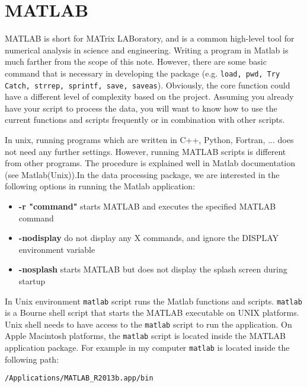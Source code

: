 \section{MATLAB\textsuperscript{\textregistered}}

MATLAB\textsuperscript{\textregistered} is short for MATrix LABoratory, and is a common high-level tool for numerical analysis in science and engineering. Writing a program in Matlab is much farther from the scope of this note. However, there are some basic command that is necessary in developing the package (e.g. \texttt{load, pwd, Try Catch, strrep, sprintf, save, saveas}). Obviously, the core function could have a different level of complexity based on the project. Assuming you already have your script to process the data, you will want to know how to use the current functions and scripts frequently or in combination with other scripts.  

\noindent
In unix, running programs which are written in C++, Python, Fortran, ... does not need any further settings. However, running MATLAB scripts is different from other programs. The procedure is explained well in Matlab documentation (see Matlab(Unix)).In the data processing package,  we are interested in the following options in running the Matlab application:

\begin{itemize}
  \item   \textbf{-r "command"} starts MATLAB and executes the specified MATLAB command
    \item \textbf{-nodisplay} do not display any X commands, and ignore the DISPLAY environment variable
  \item   \textbf{-nosplash} starts MATLAB but does not display the splash screen during startup
\end{itemize}

\noindent
In Unix environment \texttt{matlab} script runs the Matlab functions and scripts. \texttt{matlab} is a Bourne shell script that starts the MATLAB executable on UNIX\textsuperscript{\textregistered} platforms. Unix shell needs to have access to the \texttt{matlab} script to run the application. On Apple Macintosh platforms, the \texttt{matlab} script is located inside the MATLAB application package. For example in my computer \texttt{matlab}  is located inside the following path:\\
 
\begin{mdframed}[hidealllines=true,backgroundcolor=gray!20]

\fontsize{10pt}{1pt}
\texttt{/Applications/MATLAB\_R2013b.app/bin}
\end{mdframed}


